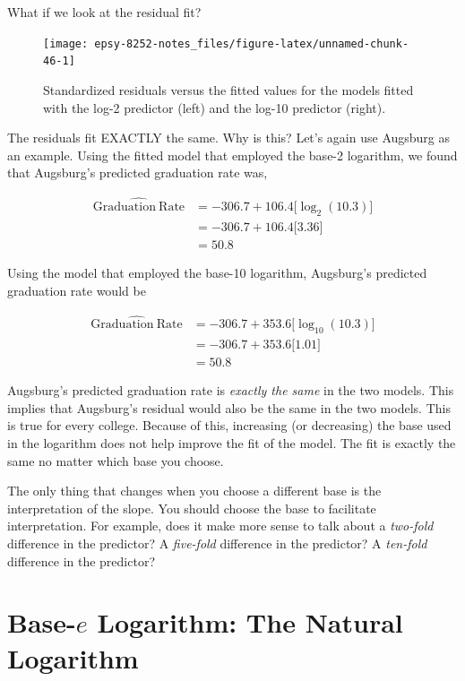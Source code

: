 \documentclass[]{book}
\begin{document}
What if we look at the residual fit?

\begin{figure}

{\centering \texttt{[image: epsy-8252-notes\_files/figure-latex/unnamed-chunk-46-1]} 

}

\caption{Standardized residuals versus the fitted values for the models fitted with the log-2 predictor (left) and the log-10 predictor (right).}\label{fig:unnamed-chunk-46}
\end{figure}

\newpage

The residuals fit EXACTLY the same. Why is this? Let's again use Augsburg as an example. Using the fitted model that employed the base-2 logarithm, we found that Augsburg's predicted graduation rate was,

\[
\begin{split}
\hat{\mathrm{Graduation~Rate}} &= -306.7 + 106.4\bigg[\log_2(10.3)\bigg] \\
&= -306.7 + 106.4\bigg[3.36\bigg] \\
&= 50.8
\end{split}
\]

Using the model that employed the base-10 logarithm, Augsburg's predicted graduation rate would be

\[
\begin{split}
\hat{\mathrm{Graduation~Rate}} &= -306.7 + 353.6\bigg[\log_{10}(10.3)\bigg] \\
&= -306.7 + 353.6\bigg[1.01\bigg] \\
&= 50.8
\end{split}
\]

Augsburg's predicted graduation rate is \emph{exactly the same} in the two models. This implies that Augsburg's residual would also be the same in the two models. This is true for every college. Because of this, increasing (or decreasing) the base used in the logarithm does not help improve the fit of the model. The fit is exactly the same no matter which base you choose.

The only thing that changes when you choose a different base is the interpretation of the slope. You should choose the base to facilitate interpretation. For example, does it make more sense to talk about a \emph{two-fold} difference in the predictor? A \emph{five-fold} difference in the predictor? A \emph{ten-fold} difference in the predictor?

\hypertarget{base-e-logarithm-the-natural-logarithm}{%
\section{\texorpdfstring{Base-\(e\) Logarithm: The Natural Logarithm}{Base-e Logarithm: The Natural Logarithm}}\label{base-e-logarithm-the-natural-logarithm}}
\end{document}
